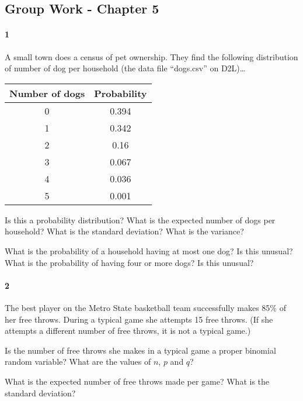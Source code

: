 \documentclass{article}
\begin{document}
\begin{flushleft}
\section*{Group Work - Chapter 5}
\paragraph{1} A small town does a census of pet ownership. They find the following distribution of number of dog per household (the data file ``dogs.csv'' on D2L)\ldots\\
{\centering
\begin{tabular}{c | c}
Number of dogs & Probability\\
\hline
0 & 0.394\\
1 & 0.342\\
2 & 0.16\\
3 & 0.067\\
4 & 0.036\\
5 & 0.001\\
\end{tabular} \par}
\begin{enumalpha}
\item Is this a probability distribution? What is the expected number of dogs per household? What is the standard deviation? What is the variance?
\vspace{3in}
\item What is the probability of a household having at most one dog? Is this unusual? What is the probability of having four or more dogs? Is this unusual?
\end{enumalpha}



\newpage
\paragraph{2} The best player on the Metro State basketball team successfully makes 85\% of her free throws. During a typical game she attempts 15 free throws. (If she attempts a different number of free throws, it is not a typical game.)
\begin{enumalpha}
\item Is the number of free throws she makes in a typical game a proper binomial random variable? What are the values of $n$, $p$ and $q$?

\vspace{1.8in}
\item What is the expected number of free throws made per game? What is the standard deviation?


\end{enumalpha}
\end{flushleft}
\end{document}
